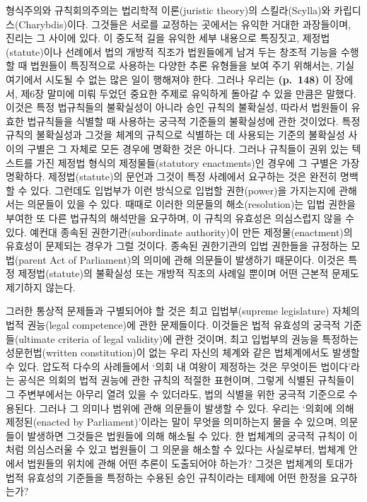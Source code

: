형식주의와 규칙회의주의는 법리학적 이론(juristic theory)의
스킬라(Scylla)와 카립디스(Charybdis)이다. 그것들은 서로를 교정하는
곳에서는 유익한 거대한 과장들이며, 진리는 그 사이에 있다. 이 중도적 길을
유익한 세부 내용으로 특징짓고, 제정법(statute)이나 선례에서 법의 개방적
직조가 법원들에게 남겨 두는 창조적 기능을 수행할 때 법원들이 특징적으로
사용하는 다양한 추론 유형들을 보여 주기 위해서는, 기실 여기에서 시도될
수 없는 많은 일이 행해져야 한다. 그러나 우리는 \textbf{(p.~148)} 이
장에서, 제6장 말미에 미뤄 두었던 중요한 주제로 유익하게 돌아갈 수 있을
만큼은 말했다. 이것은 특정 법규칙들의 불확실성이 아니라 승인 규칙의
불확실성, 따라서 법원들이 유효한 법규칙들을 식별할 때 사용하는 궁극적
기준들의 불확실성에 관한 것이었다. 특정 규칙의 불확실성과 그것을 체계의
규칙으로 식별하는 데 사용되는 기준의 불확실성 사이의 구별은 그 자체로
모든 경우에 명확한 것은 아니다. 그러나 규칙들이 권위 있는 텍스트를 가진
제정법 형식의 제정물들(statutory enactments)인 경우에 그 구별은 가장
명확하다. 제정법(statute)의 문언과 그것이 특정 사례에서 요구하는 것은
완전히 명백할 수 있다. 그런데도 입법부가 이런 방식으로 입법할
권한(power)을 가지는지에 관해서는 의문들이 있을 수 있다. 때때로 이러한
의문들의 해소(resolution)는 입법 권한을 부여한 또 다른 법규칙의 해석만을
요구하며, 이 규칙의 유효성은 의심스럽지 않을 수 있다. 예컨대 종속된
권한기관(subordinate authority)이 만든 제정물(enactment)의 유효성이
문제되는 경우가 그럴 것이다. 종속된 권한기관의 입법 권한들을 규정하는
모법(parent Act of Parliament)의 의미에 관해 의문들이 발생하기 때문이다.
이것은 특정 제정법(statute)의 불확실성 또는 개방적 직조의 사례일 뿐이며
어떤 근본적 문제도 제기하지 않는다.

그러한 통상적 문제들과 구별되어야 할 것은 최고 입법부(supreme
legislature) 자체의 법적 권능(legal competence)에 관한 문제들이다.
이것들은 법적 유효성의 궁극적 기준들(ultimate criteria of legal
validity)에 관한 것이며, 최고 입법부의 권능을 특정하는 성문헌법(written
constitution)이 없는 우리 자신의 체계와 같은 법체계에서도 발생할 수
있다. 압도적 다수의 사례들에서 ‘의회 내 여왕이 제정하는 것은 무엇이든
법이다’라는 공식은 의회의 법적 권능에 관한 규칙의 적절한 표현이며,
그렇게 식별된 규칙들이 그 주변부에서는 아무리 열려 있을 수 있더라도,
법의 식별을 위한 궁극적 기준으로 수용된다. 그러나 그 의미나 범위에 관해
의문들이 발생할 수 있다. 우리는 ‘의회에 의해 제정된(enacted by
Parliament)’이라는 말이 무엇을 의미하는지 물을 수 있으며, 의문들이
발생하면 그것들은 법원들에 의해 해소될 수 있다. 한 법체계의 궁극적
규칙이 이처럼 의심스러울 수 있고 법원들이 그 의문을 해소할 수 있다는
사실로부터, 법체계 안에서 법원들의 위치에 관해 어떤 추론이 도출되어야
하는가? 그것은 법체계의 토대가 법적 유효성의 기준들을 특정하는 수용된
승인 규칙이라는 테제에 어떤 한정을 요구하는가?

